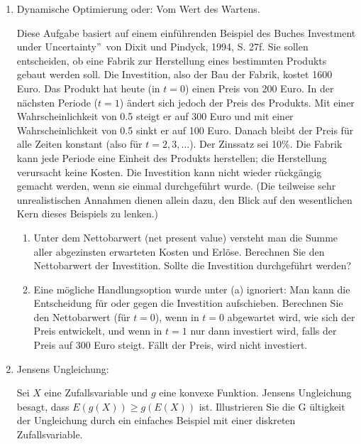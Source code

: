 \begin{enumerate}
\item Dynamische Optimierung oder: Vom Wert des Wartens.

Diese Aufgabe basiert auf einem einf\"{u}hrenden Beispiel des Buches
\quotedblbase Investment under Uncertainty\textquotedblright\ von Dixit und
Pindyck, 1994, S. 27f. Sie sollen entscheiden, ob eine Fabrik zur
Herstellung eines bestimmten Produkts gebaut werden soll. Die Investition,
also der Bau der Fabrik, kostet 1600 Euro. Das Produkt hat heute (in $t=0$)
einen Preis von 200 Euro. In der n\"{a}chsten Periode ($t=1$) \"{a}ndert
sich jedoch der Preis des Produkts. Mit einer Wahrscheinlichkeit von 0.5
steigt er auf 300 Euro und mit einer Wahrscheinlichkeit von 0.5 sinkt er auf
100 Euro. Danach bleibt der Preis f\"{u}r alle Zeiten konstant (also f\"{u}r 
$t=2,3,\ldots $). Der Zinssatz sei 10\%. Die Fabrik kann jede Periode eine
Einheit des Produkts herstellen; die Herstellung verursacht keine Kosten.
Die Investition kann nicht wieder r\"{u}ckg\"{a}ngig gemacht werden, wenn
sie einmal durchgef\"{u}hrt wurde. (Die teilweise sehr unrealistischen
Annahmen dienen allein dazu, den Blick auf den wesentlichen Kern dieses
Beispiels zu lenken.)

\begin{enumerate}
\item Unter dem Nettobarwert (net present value) versteht man die Summe
aller abgezinsten erwarteten Kosten und Erl\"{o}se. Berechnen Sie den
Nettobarwert der Investition. Sollte die Investition durchgef\"{u}hrt werden?
\item Eine m\"{o}gliche Handlungsoption wurde unter (a) ignoriert: Man kann
die Entscheidung f\"{u}r oder gegen die Investition aufschieben. Berechnen
Sie den Nettobarwert (f\"{u}r $t=0$), wenn in $t=0$ abgewartet wird, wie
sich der Preis entwickelt, und wenn in $t=1$ nur dann investiert wird, falls
der Preis auf 300 Euro steigt. F\"{a}llt der Preis, wird nicht investiert.
\end{enumerate}

\item Jensens Ungleichung:

Sei $X$ eine Zufallsvariable und $g$ eine konvexe Funktion. Jensens
Ungleichung besagt, dass $E(g(X))\geq g(E(X))$ ist. Illustrieren Sie die G%
\"{u}ltigkeit der Ungleichung durch ein einfaches Beispiel mit einer
diskreten Zufallsvariable.
\end{enumerate}
